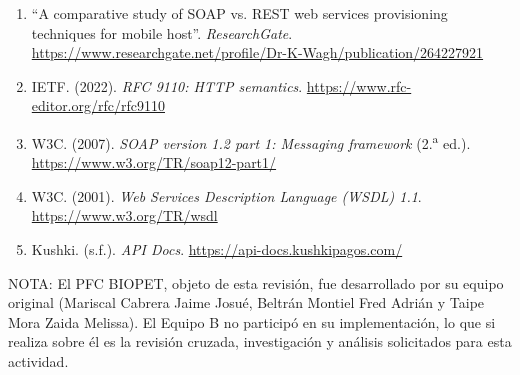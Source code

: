 \documentclass[11pt,a4paper]{article}
\begin{document}
\begin{enumerate}[leftmargin=*, itemsep=6pt]
\item ``A comparative study of SOAP vs. REST web services provisioning
techniques for mobile host''. \emph{ResearchGate}.
\url{https://www.researchgate.net/profile/Dr-K-Wagh/publication/264227921}

\item IETF. (2022). \emph{RFC 9110: HTTP semantics}.
\url{https://www.rfc-editor.org/rfc/rfc9110}

\item W3C. (2007). \emph{SOAP version 1.2 part 1: Messaging framework}
(2.\textsuperscript{a} ed.). \url{https://www.w3.org/TR/soap12-part1/}

\item W3C. (2001). \emph{Web Services Description Language (WSDL) 1.1}.
\url{https://www.w3.org/TR/wsdl}

\item Kushki. (s.f.). \emph{API Docs}. \url{https://api-docs.kushkipagos.com/}

\end{enumerate}


\vspace{2.5cm}
{\normalsize NOTA: El PFC BIOPET, objeto de esta revisión, fue desarrollado por su equipo original (Mariscal Cabrera Jaime Josué, Beltrán Montiel Fred Adrián y Taipe Mora Zaida Melissa). El Equipo B no participó en su implementación, lo que si realiza sobre él es la revisión cruzada, investigación y análisis solicitados para esta actividad.\par}
\end{document}

